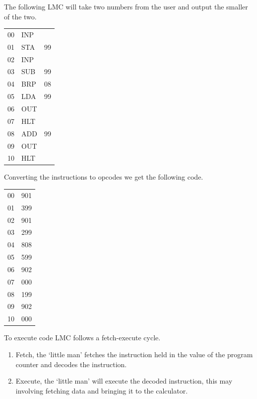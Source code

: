 \begin{example}
    The following LMC will take two numbers from the user and output the smaller of the two.
    \begin{center}
        \normalfont
        \ttfamily
        \begin{tabular}{p{1em} p{2em} p{2em}}
            00 & INP \\
            01 & STA & 99 \\
            02 & INP \\
            03 & SUB & 99 \\
            04 & BRP & 08 \\
            05 & LDA & 99 \\
            06 & OUT \\
            07 & HLT \\
            08 & ADD & 99 \\
            09 & OUT \\
            10 & HLT \\
        \end{tabular}
    \end{center}
    Converting the instructions to opcodes we get the following code.
    \begin{center}
        \normalfont
        \ttfamily
        \begin{tabular}{p{1em} p{2em}}
            00 & 901 \\
            01 & 399 \\
            02 & 901 \\
            03 & 299 \\
            04 & 808 \\
            05 & 599 \\
            06 & 902 \\
            07 & 000 \\
            08 & 199 \\
            09 & 902 \\
            10 & 000 \\
        \end{tabular}
    \end{center}
\end{example}

\begin{definition}
    To execute code LMC follows a fetch-execute cycle. 
    \begin{enumerate}
        \item Fetch, the `little man' fetches the instruction held in the value of the program counter and decodes the instruction.
        \item Execute, the `little man' will execute the decoded instruction, this may involving fetching data and bringing it to the calculator.
    \end{enumerate}
\end{definition}

